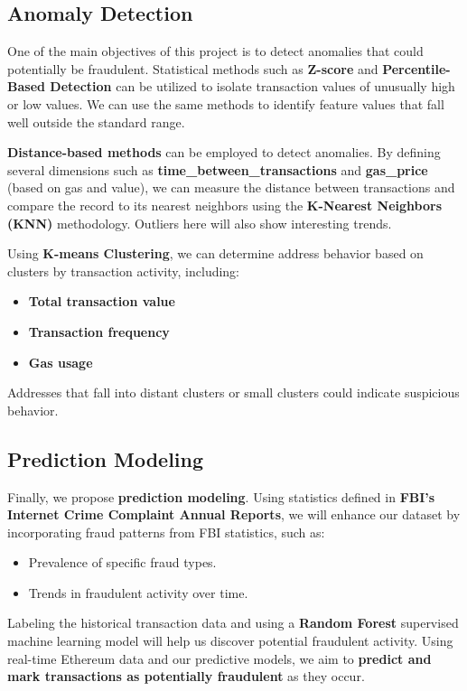 \documentclass[sigconf]{acmart}
\begin{document}
\subsection{Anomaly Detection}

One of the main objectives of this project is to detect anomalies that could potentially be fraudulent. Statistical methods such as \textbf{Z-score} and \textbf{Percentile-Based Detection} can be utilized to isolate transaction values of unusually high or low values. We can use the same methods to identify feature values that fall well outside the standard range.

\textbf{Distance-based methods} can be employed to detect anomalies. By defining several dimensions such as \textbf{time\_between\_transactions} and \textbf{gas\_price} (based on gas and value), we can measure the distance between transactions and compare the record to its nearest neighbors using the \textbf{K-Nearest Neighbors (KNN)} methodology. Outliers here will also show interesting trends. 

Using \textbf{K-means Clustering}, we can determine address behavior based on clusters by transaction activity, including:
\begin{itemize}
    \item \textbf{Total transaction value}
    \item \textbf{Transaction frequency}
    \item \textbf{Gas usage}
\end{itemize}
Addresses that fall into distant clusters or small clusters could indicate suspicious behavior.

\subsection{Prediction Modeling}

Finally, we propose \textbf{prediction modeling}. Using statistics defined in \textbf{FBI’s Internet Crime Complaint Annual Reports}, we will enhance our dataset by incorporating fraud patterns from FBI statistics, such as:
\begin{itemize}
    \item Prevalence of specific fraud types.
    \item Trends in fraudulent activity over time.
\end{itemize}
Labeling the historical transaction data and using a \textbf{Random Forest} supervised machine learning model will help us discover potential fraudulent activity. Using real-time Ethereum data and our predictive models, we aim to \textbf{predict and mark transactions as potentially fraudulent} as they occur.
\end{document}
